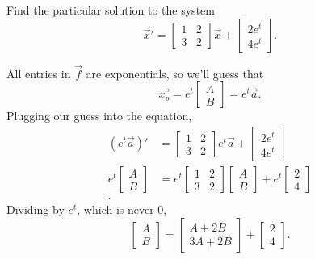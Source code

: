 \begin{example}
	Find the particular solution to the system
	\begin{equation*}
		\vec{x}' = \begin{bmatrix}
			1 & 2 \\
			3 & 2
		\end{bmatrix}\vec{x} + \begin{bmatrix}
			2e^t \\
			4e^t
		\end{bmatrix}.
	\end{equation*}
\end{example}
\noindent
All entries in $\vec{f}$ are exponentials, so we'll guess that
\begin{equation*}
	\vec{x_p} = e^t\begin{bmatrix}
		A \\
		B
	\end{bmatrix} = e^t\vec{a}.
\end{equation*}
Plugging our guess into the equation,
\begin{align*}
	\left(e^t\vec{a}\right)' &= \begin{bmatrix}
		1 & 2 \\
		3 & 2
	\end{bmatrix}e^t\vec{a} + \begin{bmatrix}
		2e^t \\
		4e^t
	\end{bmatrix} \\
	e^t\begin{bmatrix}
		A \\
		B
	\end{bmatrix} &= e^t\begin{bmatrix}
		1 & 2 \\
		3 & 2
	\end{bmatrix}\begin{bmatrix}
		A \\ 
		B
	\end{bmatrix} + e^t\begin{bmatrix}
		2 \\
		4
	\end{bmatrix} \\.
\end{align*}
Dividing by $e^t$, which is never 0,
\begin{equation*}
	\begin{bmatrix}
		A \\
		B
	\end{bmatrix} = \begin{bmatrix}
		A + 2B \\
		3A + 2B 
	\end{bmatrix} + \begin{bmatrix}
		2 \\
		4
	\end{bmatrix}.
\end{equation*}
